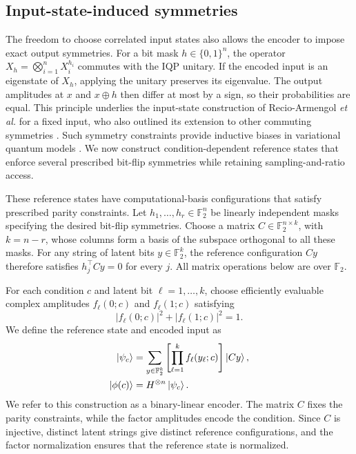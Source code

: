\documentclass[pra,aps,10pt,twocolumn,floatfix,superscriptaddress, notitlepage,longbibliography]{revtex4-2}
\begin{document}
\subsection{Input-state-induced symmetries}
\label{sec:input-symmetry}

The freedom to choose correlated input states also allows the encoder to impose exact output symmetries. For a bit mask $h\in\{0,1\}^n$, the operator $X_h=\bigotimes_{i=1}^n X_i^{h_i}$ commutes with the IQP unitary. If the encoded input is an eigenstate of $X_h$, applying the unitary preserves its eigenvalue. The output amplitudes at $x$ and $x\oplus h$ then differ at most by a sign, so their probabilities are equal. This principle underlies the input-state construction of Recio-Armengol \textit{et al.} for a fixed input, who also outlined its extension to other commuting symmetries \cite[Sec.~6]{recio-armengolTrainClassicalDeploy2026}. Such symmetry constraints provide inductive biases in variational quantum models \cite{meyerExploitingSymmetry2023}. We now construct condition-dependent reference states that enforce several prescribed bit-flip symmetries while retaining sampling-and-ratio access.

These reference states have computational-basis configurations that satisfy prescribed parity constraints. Let $h_1,\ldots,h_r\in\mathbb F_2^n$ be linearly independent masks specifying the desired bit-flip symmetries. Choose a matrix $C\in\mathbb F_2^{n\times k}$, with $k=n-r$, whose columns form a basis of the subspace orthogonal to all these masks. For any string of latent bits $y\in\mathbb F_2^k$, the reference configuration $Cy$ therefore satisfies $h_j^\top Cy=0$ for every $j$. All matrix operations below are over $\mathbb F_2$.

For each condition $c$ and latent bit $\ell=1,\ldots,k$, choose efficiently evaluable complex amplitudes $f_\ell(0;c)$ and $f_\ell(1;c)$ satisfying
\begin{equation}
    |f_\ell(0;c)|^2+|f_\ell(1;c)|^2=1.
    \label{eq:binary-encoder-factors}
\end{equation}
We define the reference state and encoded input as
\begin{equation}
\begin{aligned}
    \ket{\psi_c}
    &=\sum_{y\in\mathbb F_2^k}
    \left[\prod_{\ell=1}^k f_\ell(y_\ell;c)\right]\ket{Cy},\\
    \ket{\phi(c)}&=H^{\otimes n}\ket{\psi_c}.
\end{aligned}
\label{eq:binary-linear-reference}
\end{equation}
We refer to this construction as a binary-linear encoder. The matrix $C$ fixes the parity constraints, while the factor amplitudes encode the condition. Since $C$ is injective, distinct latent strings give distinct reference configurations, and the factor normalization ensures that the reference state is normalized.
\end{document}
